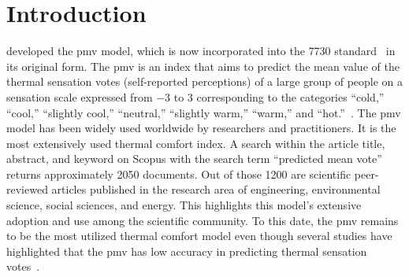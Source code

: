 \section{Introduction}\label{sec:introduction}
 developed the \ac{pmv} model, which is now incorporated into the \gls{7730} standard~\cite{iso7730} in its original form.
The \ac{pmv} is an index that aims to predict the mean value of the thermal sensation votes (self-reported perceptions) of a large group of people on a sensation scale expressed from \num{-3} to \num{3} corresponding to the categories ``cold,'' ``cool,'' ``slightly cool,'' ``neutral,'' ``slightly warm,'' ``warm,'' and ``hot.''~\cite{iso7730, ashrae552023}.
The \ac{pmv} model has been widely used worldwide by researchers and practitioners.
It is the most extensively used thermal comfort index.
A search within the article title, abstract, and keyword on Scopus with the search term ``predicted mean vote'' returns approximately \num{2050} documents.
Out of those \num{1200} are scientific peer-reviewed articles published in the research area of engineering, environmental science, social sciences, and energy.
This highlights this model's extensive adoption and use among the scientific community.
To this date, the \ac{pmv} remains to be the most utilized thermal comfort model even though several studies have highlighted that the \ac{pmv} has low accuracy in predicting thermal sensation votes~\cite{Cheung2019, Yao2022, Humphreys2002, doherty_evaluation_1988}.

